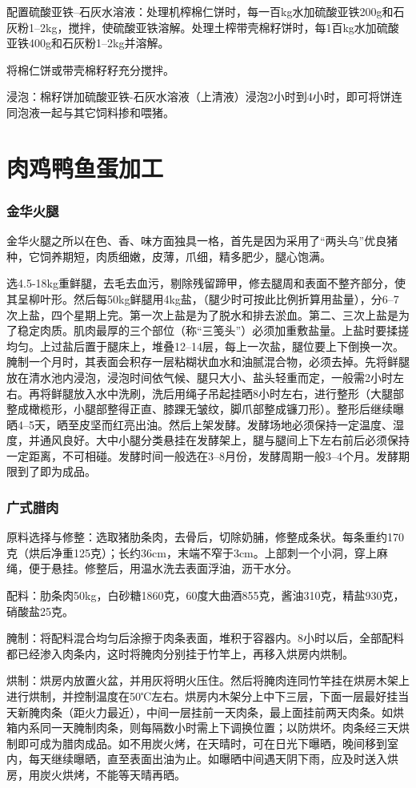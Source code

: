 \documentclass{ctexbook}
\begin{document}
配置硫酸亚铁--石灰水溶液：处理机榨棉仁饼时，每一百kg水加硫酸亚铁200g和石灰粉1--2kg，搅拌，使硫酸亚铁溶解。处理土榨带壳棉籽饼时，每1百kg水加硫酸亚铁400g和石灰粉1--2kg并溶解。

将棉仁饼或带壳棉籽籽充分搅拌。

浸泡：棉籽饼加硫酸亚铁-石灰水溶液（上清液）浸泡2小时到4小时，即可将饼连同泡液一起与其它饲料掺和喂猪。
\chapter{肉鸡鸭鱼蛋加工}
\subsection{金华火腿}
金华火腿之所以在色、香、味方面独具一格，首先是因为采用了“两头乌”优良猪种，它饲养期短，肉质细嫩，皮薄，爪细，精多肥少，腿心饱满。

选4.5-18kg重鲜腿，去毛去血污，剔除残留蹄甲，修去腿周和表面不整齐部分，使其呈柳叶形。然后每50kg鲜腿用4kg盐，（腿少时可按此比例折算用盐量），分6--7次上盐，四个星期上完。第一次上盐是为了脱水和排去淤血。第二、三次上盐是为了稳定肉质。肌肉最厚的三个部位（称“三笺头”）必须加重敷盐量。上盐时要揉搓均匀。上过盐后置于腿床上，堆叠12--14层，每上一次盐，腿位要上下倒换一次。腌制一个月时，其表面会积存一层粘糊状血水和油腻混合物，必须去掉。先将鲜腿放在清水池内浸泡，浸泡时间依气候、腿只大小、盐头轻重而定，一般需2小时左右。再将鲜腿放入水中洗刷，洗后用绳子吊起挂晒8小时左右，进行整形（大腿部整成橄榄形，小腿部整得正直、膝踝无皱纹，脚爪部整成镰刀形）。整形后继续曝晒4--5天，晒至皮坚而红亮出油。然后上架发酵。发酵场地必须保持一定温度、湿度，并通风良好。大中小腿分类悬挂在发酵架上，腿与腿间上下左右前后必须保持一定距离，不可相碰。发酵时间一般选在3--8月份，发酵周期一般3--4个月。发酵期限到了即为成品。
\subsection{广式腊肉}
原料选择与修整：选取猪肋条肉，去骨后，切除奶脯，修整成条状。每条重约170克（烘后净重125克）；长约36cm，末端不窄于3cm。上部刺一个小洞，穿上麻绳，便于悬挂。修整后，用温水洗去表面浮油，沥干水分。

配料：肋条肉50kg，白砂糖1860克，60度大曲酒855克，酱油310克，精盐930克，硝酸盐25克。

腌制：将配料混合均匀后涂擦于肉条表面，堆积于容器内。8小时以后，全部配料都已经渗入肉条内，这时将腌肉分别挂于竹竿上，再移入烘房内烘制。

烘制：烘房内放置火盆，并用灰将明火压住。然后将腌肉连同竹竿挂在烘房木架上进行烘制，并控制温度在50℃左右。烘房内木架分上中下三层，下面一层最好挂当天新腌肉条（距火力最近），中间一层挂前一天肉条，最上面挂前两天肉条。如烘箱内系同一天腌制肉条，则每隔数小时需上下调换位置；以防烘坏。肉条经三天烘制即可成为腊肉成品。如不用炭火烤，在天晴时，可在日光下曝晒，晚间移到室内，每天继续曝晒，直至表面出油为止。如曝晒中间遇天阴下雨，应及时送入烘房，用炭火烘烤，不能等天晴再晒。
\end{document}
